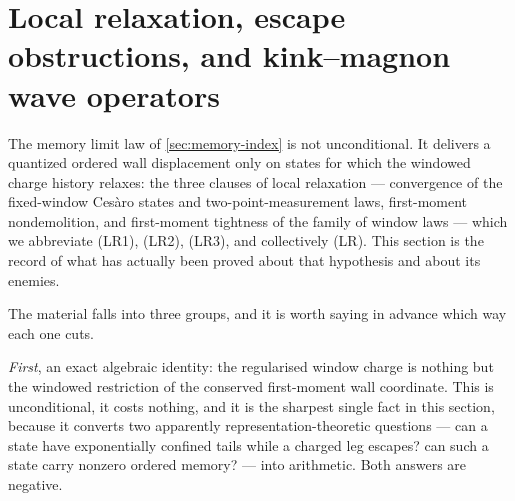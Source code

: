 
\newcommand{\Qrel}{\mathcal{Q}}              %
\newcommand{\Nesc}{\mathcal{N}}              %
\newcommand{\NDW}{N_{\mathrm{DW}}}           %
\providecommand{\lamt}{\widetilde{\lambda}}  %
\newcommand{\dev}{D}                         %

\section{Local relaxation, escape obstructions, and kink--magnon wave operators}
\label{sec:local-relaxation}

The memory limit law of \cref{sec:memory-index} is not unconditional. It
delivers a quantized ordered wall displacement only on states for which the
windowed charge history relaxes: the three clauses of local relaxation
--- convergence of the fixed-window Ces\`aro states and two-point-measurement
laws, first-moment nondemolition, and first-moment tightness of the family of
window laws --- which we abbreviate (LR1), (LR2), (LR3), and collectively (LR).
This section is the record of what has actually been proved about that
hypothesis and about its enemies.

The material falls into three groups, and it is worth saying in advance which
way each one cuts.

\emph{First}, an exact algebraic identity: the regularised window charge is
nothing but the windowed restriction of the conserved first-moment wall
coordinate. This is unconditional, it costs nothing, and it is the sharpest
single fact in this section, because it converts two apparently
representation-theoretic questions --- can a state have exponentially confined
tails while a charged leg escapes? can such a state carry nonzero ordered
memory? --- into arithmetic. Both answers are negative.

